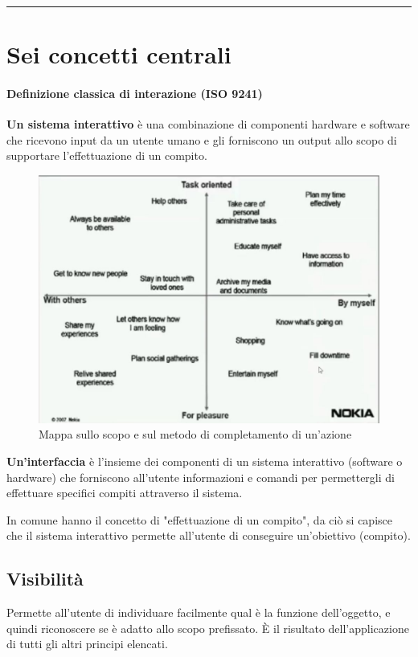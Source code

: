 \documentclass[11pt,a4paper]{book}
\begin{document}
\noindent\rule{\textwidth}{1pt}

\section{Sei concetti centrali}
\paragraph{Definizione classica di interazione (ISO 9241)} \label{par: ISO 9241}
\textbf{Un sistema interattivo} è una combinazione di componenti hardware e software che ricevono input da un utente umano e gli forniscono un output allo scopo di supportare l'effettuazione di un compito.

\begin{figure}[h!]
	\begin{center}
		\includegraphics[scale=0.5]{img/003.jpg}
		\caption{Mappa sullo scopo e sul metodo di completamento di un'azione}
		\label{fig: 003}
	\end{center}
\end{figure}

\textbf{Un'interfaccia} è l'insieme dei componenti di un sistema interattivo (software o hardware) che forniscono all'utente informazioni e comandi per permettergli di effettuare specifici compiti attraverso il sistema. \label{par: sistema interattivo}

In comune hanno il concetto di "effettuazione di un compito", da ciò si capisce che il sistema interattivo permette all'utente di conseguire un'obiettivo (compito).

\subsection{Visibilità}
Permette all’utente di individuare facilmente qual è la funzione dell’oggetto, e quindi riconoscere se è adatto allo scopo prefissato. È il risultato dell’applicazione di tutti gli altri principi elencati.
\end{document}
